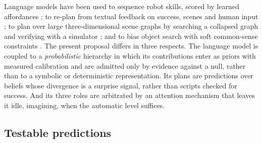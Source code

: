 Language models have been used to sequence robot skills, scored by learned affordances \cite{ahn2022saycan}; to
re-plan from textual feedback on success, scenes and human input \cite{huang2022inner}; to plan over large
three-dimensional scene graphs by searching a collapsed graph and verifying with a simulator \cite{rana2023sayplan};
and to bias object search with soft common-sense constraints \cite{zhou2023esc}. The present proposal differs in three
respects. The language model is coupled to a \emph{probabilistic} hierarchy in which its contributions enter as
priors with measured calibration and are admitted only by evidence against a null, rather than to a symbolic or
deterministic representation. Its plans are predictions over beliefs whose divergence is a surprise signal, rather
than scripts checked for success. And its three roles are arbitrated by an attention mechanism that leaves it idle,
imagining, when the automatic level suffices.

\subsection{Testable predictions}
\label{sec:lang_hierarchy:predictions}

